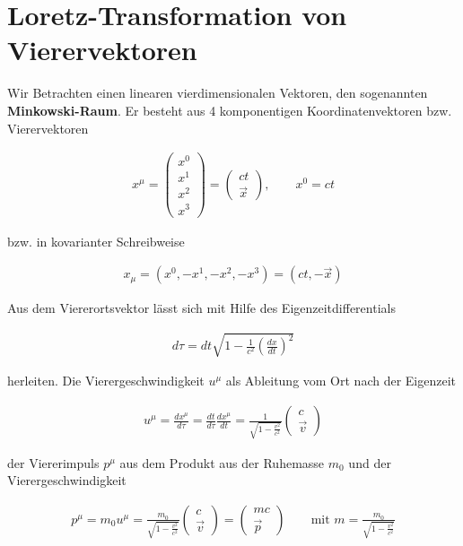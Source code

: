 
\usepackage{amsmath} 





\section*{Loretz-Transformation von Vierervektoren}


Wir Betrachten einen linearen vierdimensionalen Vektoren, den sogenannten  \textbf{Minkowski-Raum}. Er besteht aus 4 komponentigen Koordinatenvektoren bzw. Vierervektoren

\begin{align}
  \label{eq:1}
  x^\mu = \begin{pmatrix}x^0\\x^1\\ x^2\\x^3 \end{pmatrix} = \begin{pmatrix}ct \\\vec x \end{pmatrix}, \qquad x^0=ct
\end{align}

bzw. in kovarianter Schreibweise

\begin{align}
  \label{eq:2}
  x_\mu = (x^0,-x^1,-x^2,-x^3) = (ct,-\vec x)
\end{align}

Aus dem Viererortsvektor lässt sich mit Hilfe des Eigenzeitdifferentials

\begin{align}
  \label{eq:7}
  d\tau = dt\sqrt{1-\frac{1}{c^2}\left(\frac{dx}{dt}\right)^2}
\end{align}

herleiten. Die Vierergeschwindigkeit \(u^\mu\) als Ableitung vom Ort nach der Eigenzeit

\begin{align}
  \label{eq:8}
  u^\mu = \frac{dx^\mu}{d\tau} = \frac{dt}{d\tau}\frac{dx^\mu}{dt}=\frac{1}{\sqrt{1-\frac{v^2}{c^2}}}\begin{pmatrix}c\\\vec v \end{pmatrix}
\end{align}

der Viererimpuls \(p^\mu\) aus dem Produkt aus der Ruhemasse \(m_0\) und der Vierergeschwindigkeit

\begin{align}
  \label{eq:9}
  p^\mu = m_0u^\mu = \frac{m_0}{\sqrt{1-\frac{v^2}{c^2}}}\begin{pmatrix}c\\\vec v \end{pmatrix} =\begin{pmatrix}mc\\\vec p \end{pmatrix}\qquad \text{mit }m= \frac{m_0}{\sqrt{1-\frac{v^2}{c^2}}}
\end{align}


